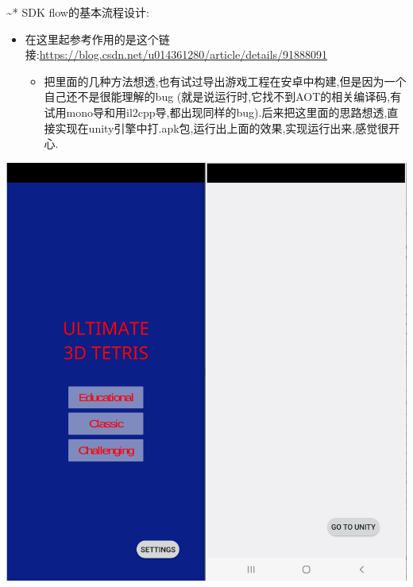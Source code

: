 \documentclass[9pt, b5paper]{article}
\begin{document}
\textasciitilde{}* SDK flow的基本流程设计:
\begin{itemize}
\item 在这里起参考作用的是这个链接:\url{https://blog.csdn.net/u014361280/article/details/91888091}
\begin{itemize}
\item 把里面的几种方法想透,也有试过导出游戏工程在安卓中构建,但是因为一个自己还不是很能理解的bug (就是说运行时,它找不到AOT的相关编译码,有试用mono导和用il2cpp导,都出现同样的bug).后来把这里面的思路想透,直接实现在unity引擎中打.apk包,运行出上面的效果,实现运行出来,感觉很开心.
\end{itemize}
\end{itemize}

\includegraphics[width=.9\linewidth]{./pic/notes_20221207_200732.png}
\end{document}
